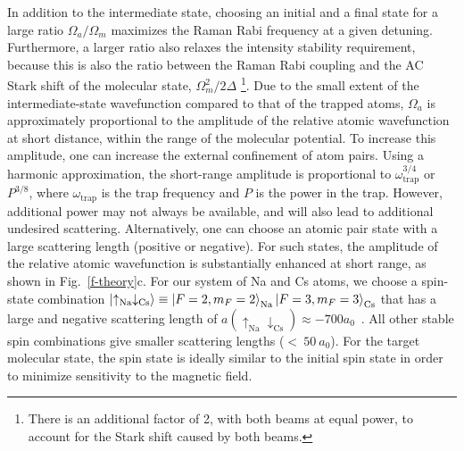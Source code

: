 \documentclass[aps,prl,twocolumn,10pt,superscriptaddress]{revtex4-1}
\newcommand{\Na}{\mathrm{Na}}
\newcommand{\Cs}{\mathrm{Cs}}
\begin{document}
In addition to the intermediate state,
choosing an initial and a final state for a large ratio $\Omega_a/\Omega_m$
maximizes the Raman Rabi frequency at a given detuning.
Furthermore, a larger ratio also relaxes the intensity stability requirement,
because this is also the ratio between the Raman Rabi coupling
and the AC Stark shift of the molecular state, $\Omega_m^2 / 2\Delta$
\footnote{There is an additional factor of 2, with both beams at equal power,
  to account for the Stark shift caused by both beams.}.
Due to the small extent of the intermediate-state wavefunction
compared to that of the trapped atoms,
$\Omega_a$ is approximately proportional to
the amplitude of the relative atomic wavefunction at short distance,
within the range of the molecular potential.
To increase this amplitude, one can increase the external confinement of atom pairs.
Using a harmonic approximation,
the short-range amplitude is proportional to $ \omega_{\text{trap}}^{3/4} $ or $P^{3/8}$,
where $ \omega_{\text{trap}} $ is the trap frequency and $P$ is the power in the trap\cite{Mies2000}. However, additional power may not always be available, and will also lead to additional undesired scattering.
Alternatively, one can choose an atomic pair state with a large scattering length
(positive or negative).
For such states, the amplitude of the relative atomic wavefunction is substantially enhanced
at short range, as shown in Fig.~\ref{f-theory}c.
For our system of Na and Cs atoms,
we choose a spin-state combination $\ket{\uparrow_{\Na} \downarrow_{\Cs}}\equiv \ket{F=2,m_F=2}_{\Na}\ket{F=3,m_F=3}_{\Cs}$ that has a large and negative scattering length of
$a(\uparrow_{\Na} \downarrow_{\Cs}) \approx -700a_0$~\cite{Hood2019}.
All other stable spin combinations give smaller scattering lengths ($<~50~a_0$).
For the target molecular state, the spin state is ideally similar to the initial spin state in order to minimize sensitivity to the magnetic field.
\end{document}
